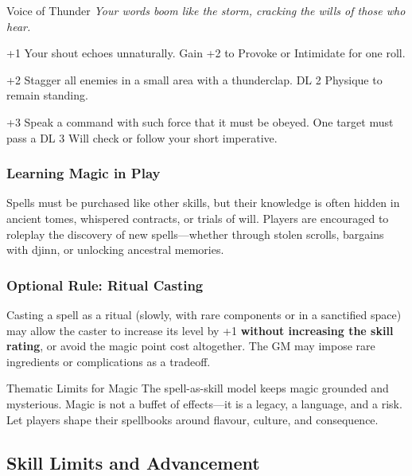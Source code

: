 \begin{WyrdSpell}[Stormcalling]{Voice of Thunder}
\textit{Your words boom like the storm, cracking the wills of those who hear.}
    \begin{WyrdSpellBlock}
        \item[+1] Your shout echoes unnaturally. Gain +2 to Provoke or Intimidate for one roll.
        \item[+2] Stagger all enemies in a small area with a thunderclap. DL 2 Physique to remain standing.
        \item[+3] Speak a command with such force that it must be obeyed. One target must pass a DL 3 Will check or follow your short imperative.
    \end{WyrdSpellBlock}
\end{WyrdSpell}


\subsubsection*{Learning Magic in Play}

Spells must be purchased like other skills, but their knowledge is often hidden in ancient tomes, whispered contracts, or trials of will. Players are encouraged to roleplay the discovery of new spells—whether through stolen scrolls, bargains with djinn, or unlocking ancestral memories.

\subsubsection*{Optional Rule: Ritual Casting}

Casting a spell as a ritual (slowly, with rare components or in a sanctified space) may allow the caster to increase its level by +1 \textbf{without increasing the skill rating}, or avoid the magic point cost altogether. The GM may impose rare ingredients or complications as a tradeoff.

\begin{CommentBox}{Thematic Limits for Magic}
    The spell-as-skill model keeps magic grounded and mysterious. Magic is not a buffet of effects—it is a legacy, a language, and a risk. Let players shape their spellbooks around flavour, culture, and consequence.
\end{CommentBox}

\subsection{Skill Limits and Advancement}

